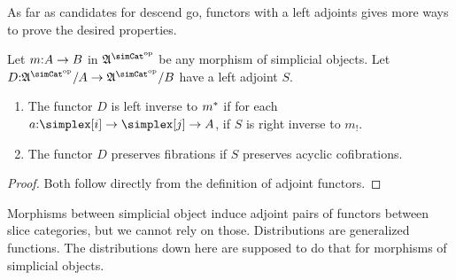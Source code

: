 \documentclass[csh.tex]{subfiles}
\begin{document}
As far as candidates for descend go, functors with a left adjoints gives more ways to prove the desired properties.
\begin{lemma}
Let $m\mathord : A\to B$ in $\ambient\s$ be any morphism of simplicial objects.
Let $D\of \ambient\s/A \to \ambient\s/B$ have a left adjoint $S$.
\begin{enumerate}
\item The functor $D$ is left inverse to $m^*$ if for each $a\of\simplex[i]\to\simplex[j]\to A$, if $S$ is right inverse to $m_!$.
\item The functor $D$ preserves fibrations if $S$ preserves acyclic cofibrations. 
\end{enumerate}
\end{lemma}

\begin{proof}
Both follow directly from the definition of adjoint functors.
\end{proof}

Morphisms between simplicial object induce adjoint pairs of functors between slice categories, but we cannot rely on those. 
Distributions are generalized functions. The distributions down here are supposed to do that for morphisms of simplicial objects.
\end{document}
